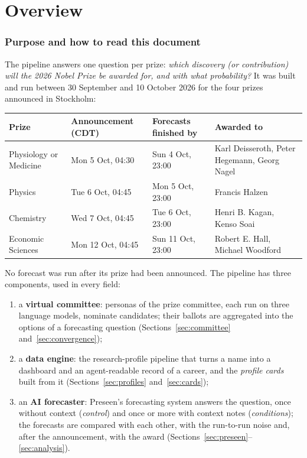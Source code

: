\documentclass[11pt,a4paper]{article}
\begin{document}
\part{Overview}

\section{Purpose and how to read this document}\label{sec:purpose}

The pipeline answers one question per prize: \emph{which discovery (or contribution) will the 2026 Nobel Prize be
awarded for, and with what probability?} It was built and run between 30 September and 10 October 2026 for the four
prizes announced in Stockholm:

\begin{center}
\small
\begin{tabularx}{\textwidth}{@{}lllL@{}}
\toprule
Prize & Announcement (CDT) & Forecasts finished by & Awarded to \\
\midrule
Physiology or Medicine & Mon 5 Oct, 04:30 & Sun 4 Oct, 23:00 & Karl Deisseroth, Peter Hegemann, Georg Nagel \\
Physics & Tue 6 Oct, 04:45 & Mon 5 Oct, 23:00 & Francis Halzen \\
Chemistry & Wed 7 Oct, 04:45 & Tue 6 Oct, 23:00 & Henri B. Kagan, Kenso Soai \\
Economic Sciences & Mon 12 Oct, 04:45 & Sun 11 Oct, 23:00 & Robert E. Hall, Michael Woodford \\
\bottomrule
\end{tabularx}
\end{center}

No forecast was run after its prize had been announced. The pipeline has three components, used in every field:

\begin{enumerate}
\item a \textbf{virtual committee}: personas of the prize committee, each run on three language models, nominate
  candidates; their ballots are aggregated into the options of a forecasting question (Sections~\ref{sec:committee}
  and~\ref{sec:convergence});
\item a \textbf{data engine}: the research-profile pipeline that turns a name into a dashboard and an agent-readable
  record of a career, and the \emph{profile cards} built from it (Sections~\ref{sec:profiles} and~\ref{sec:cards});
\item an \textbf{AI forecaster}: Preseen's forecasting system answers the question, once without context
  (\emph{control}) and once or more with context notes (\emph{conditions}); the forecasts are compared with each other,
  with the run-to-run noise and, after the announcement, with the award (Sections~\ref{sec:preseen}--\ref{sec:analysis}).
\end{enumerate}
\end{document}
